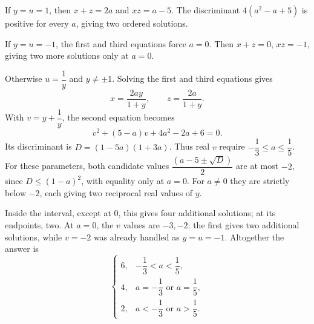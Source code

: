 If $y=u=1$, then $x+z=2a$ and $xz=a-5$. The discriminant $4(a^2-a+5)$ is positive for every $a$, giving two ordered solutions.

If $y=u=-1$, the first and third equations force $a=0$. Then $x+z=0$, $xz=-1$, giving two more solutions only at $a=0$.

Otherwise $u=\dfrac{1}{y}$ and $y\ne\pm1$. Solving the first and third equations gives
\[
x=\dfrac{2ay}{1+y},\qquad z=\dfrac{2a}{1+y}.
\]
With $v=y+\dfrac{1}{y}$, the second equation becomes
\[
v^2+(5-a)v+4a^2-2a+6=0.
\]
Its discriminant is $D=(1-5a)(1+3a)$. Thus real $v$ require $-\dfrac{1}{3}\le a\le\dfrac{1}{5}$. For these parameters, both candidate values $\dfrac{(a-5\pm\sqrt D)}{2}$ are at most $-2$, since $D\le(1-a)^2$, with equality only at $a=0$. For $a\ne0$ they are strictly below $-2$, each giving two reciprocal real values of $y$.

Inside the interval, except at $0$, this gives four additional solutions; at its endpoints, two. At $a=0$, the $v$ values are $-3,-2$: the first gives two additional solutions, while $v=-2$ was already handled as $y=u=-1$. Altogether the answer is
\[
\boxed{\begin{cases}
6,&-\dfrac{1}{3}<a<\dfrac{1}{5},\\
4,&a=-\dfrac{1}{3}\text{ or }a=\dfrac{1}{5},\\
2,&a<-\dfrac{1}{3}\text{ or }a>\dfrac{1}{5}.
\end{cases}}
\]
